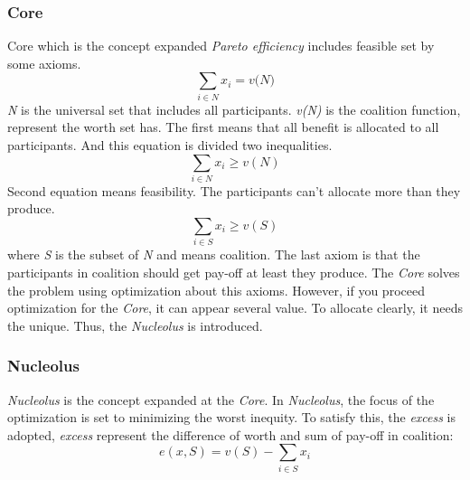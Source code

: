 \documentclass[journal]{IEEEtran} %
\begin{document}

\subsubsection{Core}
Core which is the concept expanded \textit{Pareto efficiency} includes feasible set by some axioms. 
\begin{equation}
\sum\limits_{i\in{N}} x_{i} = \textit{v(N)}
\end{equation}
\textit{N} is the universal set that includes all participants. \textit{v(N)} is the coalition function, represent the worth set has. The first means that all benefit is allocated to all participants. And this equation is divided two inequalities.
\begin{equation}
\sum\limits_{i\in{N}} x_{i} \geq v(N)
\end{equation}
Second equation means feasibility. The participants can't allocate more than they produce.
\begin{equation}
\sum\limits_{i\in{S}} x_{i} \geq v(S)
\end{equation}
where \textit{S} is the subset of \textit{N} and means coalition. The last axiom is that the participants in coalition should get pay-off at least they produce.
The \textit{Core} solves the problem using optimization about this axioms. However, if you proceed optimization for the \textit{Core}, it can  appear several value. To allocate clearly, it needs the unique. Thus, the \textit{Nucleolus} is introduced.

\subsubsection{Nucleolus}
\textit{Nucleolus} is the concept expanded at the \textit{Core}. In \textit{Nucleolus}, the focus of the optimization is set to minimizing the worst inequity. To satisfy this, the \textit{excess} is adopted, \textit{excess} represent the difference of worth and sum of pay-off in coalition:
\begin{equation}
e(x,S) = v(S) - \sum\limits_{i\in{S}} x_i
\end{equation}
\end{document}
